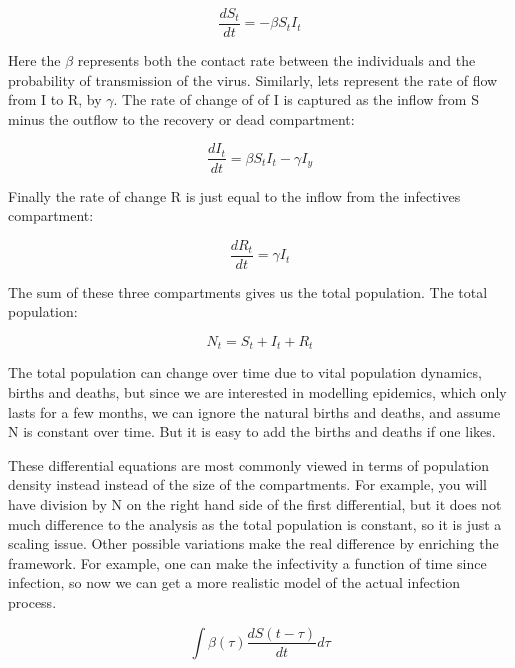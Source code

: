 \documentclass[fontsize=17pt]{article}
\begin{document}
\begin{equation}\label{equ: SIR_suseptical}
	\frac{dS_{t}}{dt}=-\beta S_{t}I_{t}
\end{equation}

Here the $\beta$ represents both the contact rate between the individuals and the probability of transmission of the virus. Similarly, lets represent the rate of flow from I to R, by $\gamma$. The rate of change of of I is captured as the inflow from S minus the outflow to the recovery or dead compartment:

\begin{equation} \label{equ: SIR_infected}
\frac{dI_{t}}{dt}=\beta S_{t}I_{t}-\gamma I_{y}
\end{equation}

Finally the rate of change R is just equal to the inflow from the infectives compartment:

\begin{equation}\label{equ: SIR_recovered}
\frac{dR_{t}}{dt}=\gamma I_{t}
\end{equation}

The sum of these three compartments gives us the total population. The total population:

\begin{equation}\label{equ: SIR_population}
N_{t}=S_{t}+I_{t}+R_{t}
\end{equation}

The total population can change over time due to vital population dynamics, births and deaths, but since we are interested in modelling epidemics, which only lasts for a few months, we can ignore the natural births and deaths, and assume N is constant over time. But it is easy to add the births and deaths if one likes.

These differential equations are most commonly viewed in terms of population density instead instead of the size of the compartments. For example, you will have division by N on the right hand side of the first differential, but it does not much difference to the analysis as the total population is constant, so it is just a scaling issue. Other possible variations make the real difference by enriching the framework. For example, one can make the infectivity a function of time since infection, so now we can get a more realistic model of the actual infection process.

\begin{equation}
\int \beta(\tau)\frac{dS(t-\tau)}{dt}d\tau
\end{equation}
\end{document}
